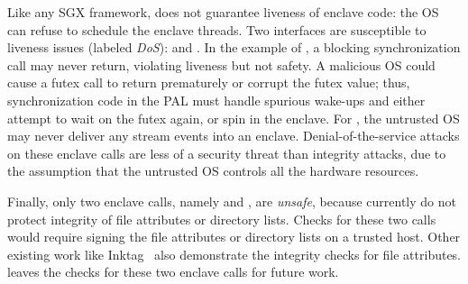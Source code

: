 Like any SGX framework, \graphenesgx{} does not guarantee liveness of enclave code: the OS can refuse to schedule the enclave threads.
Two interfaces are susceptible to liveness issues (labeled {\em DoS}):  and .
In the example of , a blocking synchronization call may never return, violating liveness but not safety.
A malicious OS could cause a futex call to return prematurely or corrupt the futex value; thus, 
synchronization code in the PAL
must handle spurious wake-ups and either attempt to wait on the futex again, or spin in the enclave.
For , the untrusted OS may never deliver any stream events into an enclave.
Denial-of-the-service attacks on these enclave calls
are less of a security threat
than integrity attacks, due to the assumption that the untrusted OS controls all the hardware resources.

Finally, only two enclave calls, namely  and , are {\em unsafe}, because \graphenesgx{} currently do not protect
integrity of file attributes or directory lists.
Checks for these two calls would require signing the file attributes or directory lists
on a trusted host.
Other existing work like Inktag~\cite{inktag} also demonstrate the integrity checks for file attributes.
\graphenesgx{} leaves the checks for these two enclave calls
for future work.



 


